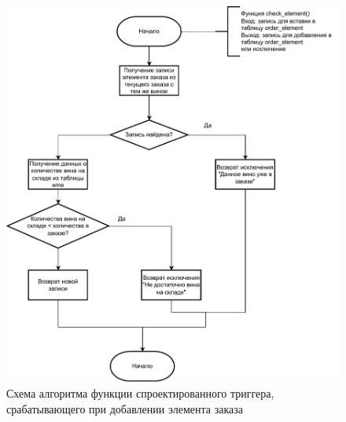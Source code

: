 \begin{figure}[H]
	\centering
	\includegraphics[scale=1]{inc/img/tr.pdf}
	\caption{Схема алгоритма функции спроектированного триггера, срабатывающего при добавлении элемента заказа}
	\label{img:tr}
\end{figure} 
